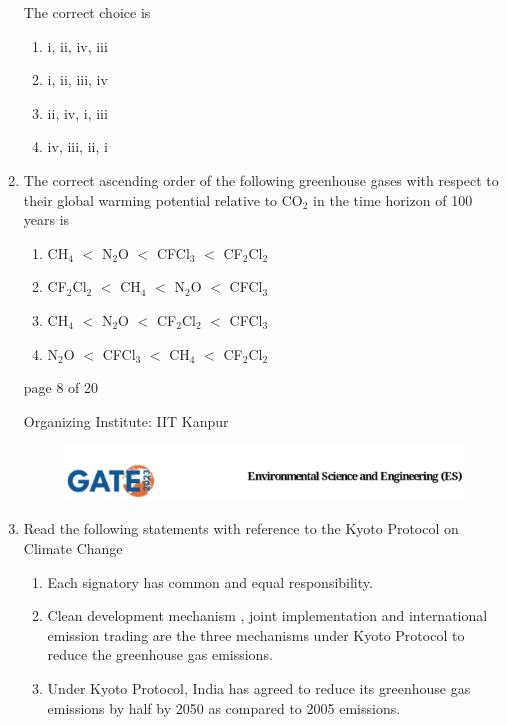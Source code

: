\documentclass[journal,12pt,onecolumn]{IEEEtran}
\theoremstyle{remark}
\begin{document}
\begin{enumerate}[start=1, label={Q\arabic*.}]
The correct choice is

\begin{enumerate}[label=(\Alph*)]
\item i, ii, iv, iii
\item i, ii, iii, iv
\item ii, iv, i, iii
\item iv, iii, ii, i
\end{enumerate}
\hfill{}

\item The correct ascending order of the following greenhouse gases with respect to their global warming potential relative to CO$_2$ in the time horizon of 100 years is

\begin{enumerate}[label=(\Alph*)]
\item CH$_4$ $<$ N$_2$O $<$ CFCl$_3$ $<$ CF$_2$Cl$_2$
\item CF$_2$Cl$_2$ $<$ CH$_4$ $<$ N$_2$O $<$ CFCl$_3$
\item CH$_4$ $<$ N$_2$O $<$ CF$_2$Cl$_2$ $<$ CFCl$_3$
\item N$_2$O $<$ CFCl$_3$ $<$ CH$_4$ $<$ CF$_2$Cl$_2$
\end{enumerate}
\hfill{}
\vfill
\begin{center}
{\Large page 8 of 20}
\end{center}
\RaggedRight
{\color{orange}
{\Large Organizing Institute: IIT Kanpur}}
\newpage
\begin{figure}
    
    \includegraphics[width=1\linewidth]{figs/latex.jpg}
    
\end{figure}
\item Read the following statements with reference to the Kyoto Protocol on Climate Change

\begin{enumerate}[label=\roman*.]
\item Each signatory  has common and equal responsibility.
\item Clean development mechanism , joint implementation  and international emission trading are the three mechanisms under Kyoto Protocol to reduce the greenhouse gas emissions.
\item Under Kyoto Protocol, India has agreed to reduce its greenhouse gas emissions by half by 2050 as compared to 2005 emissions.
\end{enumerate}


\end{enumerate}
\end{document}
